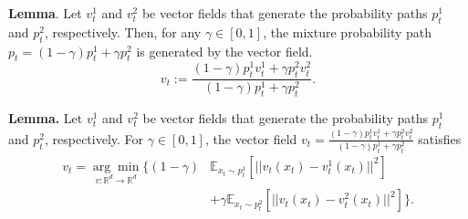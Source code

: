 \documentclass{beamer}
\begin{document}
    \begin{frame}
    \textbf{Lemma}. Let $v_t^1$ and $v_t^2$ be vector fields that generate the probability paths $p_t^1$ and $p_t^2$, respectively. Then, for any $\gamma \in [0, 1]$, the mixture probability path $p_t = (1 - \gamma)p_t^1 + \gamma p_t^2$ is generated by the vector field.
\[ v_t := \frac{(1-\gamma)p_t^1v_t^1 + \gamma p_t^2v_t^2}{(1-\gamma)p_t^1 + \gamma p_t^2}. \]
    \end{frame}
\begin{frame}
    \textbf{Lemma.} Let $v_t^1$ and $v_t^2$ be vector fields that generate the probability paths $p_t^1$ and $p_t^2$, respectively. For $\gamma \in [0,1]$, the vector field $v_t = \frac{(1-\gamma)p_t^1v_t^1 + \gamma p_t^2v_t^2}{(1-\gamma)p_t^1 + \gamma p_t^2}$ satisfies
    \begin{align*}
        v_t = \underset{v: \mathbb{R}^d \to \mathbb{R}^d}{\arg \min} \Big\{ (1 - \gamma) &\mathbb{E}_{x_t \sim p_t^1} \left[ ||v_t(x_t) - v_t^1(x_t)||^2 \right] \\ &+ \gamma \mathbb{E}_{x_t \sim p_t^2} \left[ ||v_t(x_t) - v_t^2(x_t)||^2 \right] \Big\}
    .\end{align*}
    \end{frame}
\end{document}
